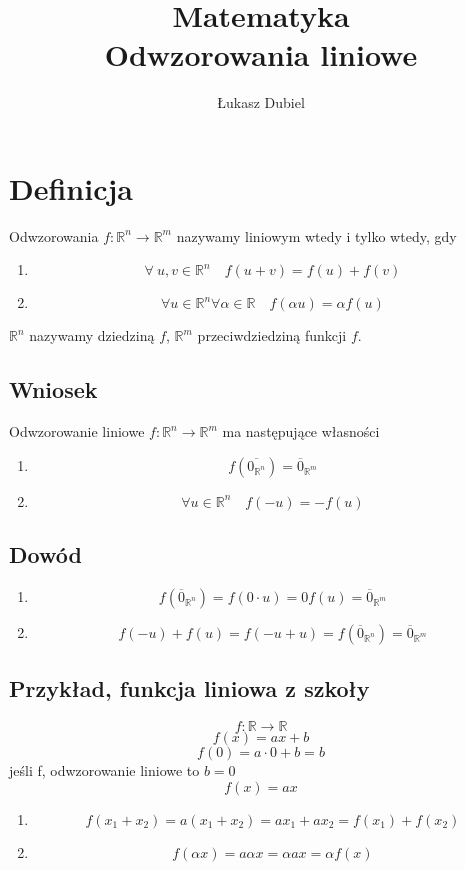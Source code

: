 \documentclass[11pt]{article}
\author{Łukasz Dubiel}
\title{Matematyka \\ Odwzorowania liniowe }
\begin{document}
\maketitle

\section{Definicja}
Odwzorowania $f: \mathbb{R}^n \to \mathbb{R}^m$ nazywamy liniowym wtedy i tylko wtedy, gdy \begin{enumerate}
\item{$$\forall\ u,v \in \mathbb{R}^n \quad f(u + v) = f(u) + f(v)$$}
\item{$$\forall u \in \mathbb{R}^n \forall \alpha \in \mathbb{R} \quad f(\alpha u) = \alpha f(u)$$}
\end{enumerate}
$\mathbb{R}^n$ nazywamy dziedziną $f$, $\mathbb{R}^m$ przeciwdziedziną funkcji $f$.
\subsection{Wniosek}
Odwzorowanie liniowe $f: \mathbb{R}^n \to \mathbb{R}^m$ ma następujące własności
\begin{enumerate}
\item{$$f(\overline{0_{\mathbb{R}^n}}) = \overline{0}_{\mathbb{R}^m}$$}
\item{$$\forall u \in \mathbb{R}^n \quad f(-u) = -f(u)$$}
\end{enumerate}
\subsection{Dowód}
\begin{enumerate}
\item{$$ f(\overline{0}_{\mathbb{R}^n}) = f( 0 \cdot u ) = 0 f(u) = \overline{0}_{\mathbb{R}^m}$$}
\item{$$f(-u) + f(u) = f( -u + u ) = f(\overline{0}_{\mathbb{R}^n}) = \overline{0}_{\mathbb{R}^m}$$}
\end{enumerate}

\subsection{Przykład, funkcja liniowa z szkoły}
$$f : \mathbb{R} \to \mathbb{R} $$
$$ f(x) = ax + b$$
$$ f(0) = a \cdot 0 + b = b $$
jeśli f, odwzorowanie liniowe to $b = 0$
$$ f(x) = ax$$
\begin{enumerate}
\item{$$f(x_1 + x_2) = a(x_1 + x_2) = ax_1 + ax_2 = f(x_1) + f(x_2)$$}
\item{$$f(\alpha x) = a \alpha x = \alpha a x = \alpha f(x)$$}
\end{enumerate}
\end{document}
